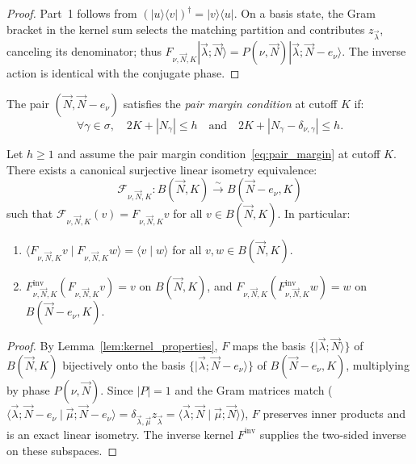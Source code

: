 \begin{proof}
Part~1 follows from $(|u\rangle \langle v|)^\dagger=|v\rangle\langle u|$. On a basis state, the Gram bracket in the kernel sum selects the matching partition and contributes $z_{\vec{\lambda}}$, canceling its denominator; thus $F_{\nu,\vec{N},K}|\vec{\lambda};\vec{N}\rangle=P(\nu,\vec{N})|\vec{\lambda};\vec{N}-e_\nu\rangle$. The inverse action is identical with the conjugate phase.
\end{proof}

\begin{definition}
\label{def:pair_margin}
The pair $(\vec{N}, \vec{N}-e_\nu)$ satisfies the \emph{pair margin condition} at cutoff $K$ if:
\begin{equation}
\label{eq:pair_margin}
\forall \gamma \in \sigma, \quad 2K + |N_\gamma| \le h \quad \text{and} \quad 2K + |N_\gamma - \delta_{\nu, \gamma}| \le h.
\end{equation}
\end{definition}

\begin{theorem}
\label{thm:klein_isometry_equiv}
Let $h \ge 1$ and assume the pair margin condition~\eqref{eq:pair_margin} at cutoff $K$. There exists a canonical surjective linear isometry equivalence:
\begin{equation}
\label{eq:typed_isometry}
\mathcal{F}_{\nu, \vec{N}, K} : B(\vec{N}, K) \xrightarrow{\sim} B(\vec{N} - e_\nu, K)
\end{equation}
such that $\mathcal{F}_{\nu, \vec{N}, K}(v) = F_{\nu, \vec{N}, K} v$ for all $v \in B(\vec{N}, K)$. In particular:
\begin{enumerate}
    \item $\langle F_{\nu, \vec{N}, K} v \mid F_{\nu, \vec{N}, K} w \rangle = \langle v \mid w \rangle$ for all $v, w \in B(\vec{N}, K)$.
    \item $F_{\nu, \vec{N}, K}^{\mathrm{inv}} (F_{\nu, \vec{N}, K} v) = v$ on $B(\vec{N}, K)$, and $F_{\nu, \vec{N}, K} (F_{\nu, \vec{N}, K}^{\mathrm{inv}} w) = w$ on $B(\vec{N} - e_\nu, K)$.
\end{enumerate}
\end{theorem}

\begin{proof}
By Lemma~\ref{lem:kernel_properties}, $F$ maps the basis $\{|\vec{\lambda}; \vec{N}\rangle\}$ of $B(\vec{N}, K)$ bijectively onto the basis $\{|\vec{\lambda}; \vec{N} - e_\nu\rangle\}$ of $B(\vec{N} - e_\nu, K)$, multiplying by phase $P(\nu, \vec{N})$. Since $|P| = 1$ and the Gram matrices match ($\langle \vec{\lambda}; \vec{N}-e_\nu \mid \vec{\mu}; \vec{N}-e_\nu \rangle = \delta_{\vec{\lambda}, \vec{\mu}} z_{\vec{\lambda}} = \langle \vec{\lambda}; \vec{N} \mid \vec{\mu}; \vec{N} \rangle$), $F$ preserves inner products and is an exact linear isometry. The inverse kernel $F^{\mathrm{inv}}$ supplies the two-sided inverse on these subspaces.
\end{proof}

